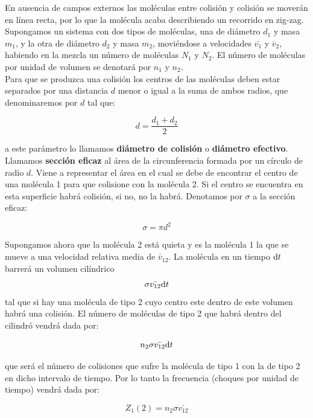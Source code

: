 \documentclass[12pt]{book}
\begin{document}
En ausencia de campos externos las moléculas entre colisión y colisión se moverán en línea recta, por lo que la molécula acaba describiendo un recorrido en zig-zag. \\

Supongamos un sistema con dos tipos de moléculas, una de diámetro $d_1$ y masa $m_1$, y la otra de diámetro $d_2$ y masa $m_2$, moviéndose a velocidades $\bar{v_1}$ y $\bar{v}_2$, habiendo en la mezcla un número de moléculas $N_1$ y $N_2$. El número de moléculas por unidad de volumen se denotará por $n_1$ y $n_2$. \\

Para que se produzca una colisión los centros de las moléculas deben estar separados por una distancia $d$ menor o igual a la suma de ambos radios, que denominaremos por $d$ tal que:

\begin{equation}
d = \dfrac{d_1 + d_2}{2}
\end{equation}

a este parámetro lo llamamos \textbf{diámetro de colisión} o \textbf{diámetro efectivo}. Llamamos \textbf{sección eficaz} al área de la circunferencia formada por un círculo de radio $d$. Viene a representar el área en el cual se debe de encontrar el centro de una molécula 1 para que colisione con la molécula 2. Si el centro se encuentra en esta superficie habrá colisión, si no, no la habrá. Denotamos por $\sigma$ a la sección eficaz:

\begin{equation}
\sigma = \pi d^2
\end{equation}

Supongamos ahora que la molécula 2 está quieta y es la molécula 1 la que se mueve a una velocidad relativa media de $\bar{v}_12$. La molécula en un tiempo $\mathrm{d} t$ barrerá un volumen cilíndrico $$ \sigma \bar{v_{12}} \mathrm{d} t $$ tal que si hay una molécula de tipo 2 cuyo centro este dentro de este volumen habrá una colisión. El número de moléculas de tipo 2 que habrá dentro del cilindró vendrá dada por:

$$ n_2 \sigma \bar{v_{12}} \mathrm{d} t $$

que será el número de colisiones que sufre la molécula de tipo 1 con la de tipo 2 en dicho intervalo de tiempo. Por lo tanto la frecuencia (choques por unidad de tiempo) vendrá dada por:

\begin{equation}
Z_1 (2) = n_2 \sigma \bar{v_{12}}
\end{equation}
\end{document}
